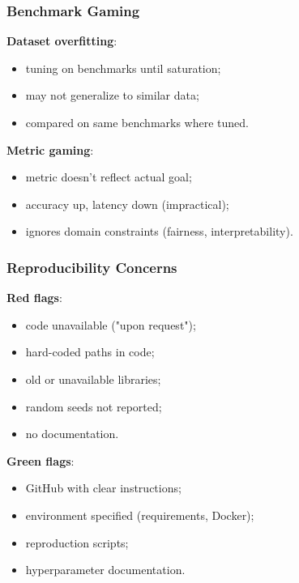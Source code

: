 \documentclass[]{beamer}
\begin{document}
\begin{frame}[fragile]
\frametitle{Benchmark Gaming}
\textbf{Dataset overfitting}:
\begin{itemize}
  \item tuning on benchmarks until saturation;
  \item may not generalize to similar data;
  \item compared on same benchmarks where tuned.
\end{itemize}

\textbf{Metric gaming}:
\begin{itemize}
  \item metric doesn't reflect actual goal;
  \item accuracy up, latency down (impractical);
  \item ignores domain constraints (fairness, interpretability).
\end{itemize}

\end{frame}

\begin{frame}[fragile]
\frametitle{Reproducibility Concerns}
\textbf{Red flags}:
\begin{itemize}
  \item code unavailable ("upon request");
  \item hard-coded paths in code;
  \item old or unavailable libraries;
  \item random seeds not reported;
  \item no documentation.
\end{itemize}

\textbf{Green flags}:
\begin{itemize}
  \item GitHub with clear instructions;
  \item environment specified (requirements, Docker);
  \item reproduction scripts;
  \item hyperparameter documentation.
\end{itemize}

\end{frame}
\end{document}

